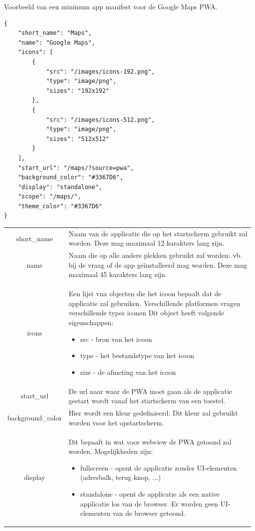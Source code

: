 	Voorbeeld van een minimum app manifest voor de Google Maps PWA.
	
\begin{lstlisting}
{
	"short_name": "Maps",
	"name": "Google Maps",
	"icons": [
		{
			"src": "/images/icons-192.png",
			"type": "image/png",
			"sizes": "192x192"
		},
		{
			"src": "/images/icons-512.png",
			"type": "image/png",
			"sizes": "512x512"
		}
	],
	"start_url": "/maps/?source=pwa",
	"background_color": "#3367D6",
	"display": "standalone",
	"scope": "/maps/",
	"theme_color": "#3367D6"
}
\end{lstlisting}
	
	
		\begin{table}[H]
			\centering
			\begin{tabular}{cp{12cm}}
	     		short\_name & Naam van de applicatie die op het startscherm gebruikt zal worden. Deze mag maximaal 12 karakters lang zijn. \\
	     		name & Naam die op alle andere plekken gebruikt zal worden: vb. bij de vraag of de app geïnstalleerd mag worden. Deze mag maximaal 45 karakters lang zijn. \\
	     		icons & Een lijst vna objecten die het icoon bepaalt dat de applicatie zal gebruiken. Verschillende platformen vragen verschillende types iconen Dit object heeft volgende eigenschappen:
		     		\begin{itemize}
			    		  \item src - bron van het icoon
			    		  \item type - het bestandstype van het icoon
			    		  \item size - de afmeting van het icoon
	     			\end{itemize} \\
	     		start\_url & De url naar waar de PWA moet gaan als de applicatie gestart wordt vanaf het startscherm van een toestel.\\
	     		background\_color & Hier wordt een kleur gedefinieerd. Dit kleur zal gebruikt worden voor het opstartscherm. \\
	     		display & Dit bepaalt in wat voor webview de PWA getoond zal worden. Mogelijkheden zijn:
		     		\begin{itemize}
			     		  \item fullscreen - opent de applicatie zonder UI-elementen (adresbalk, terug knop, ...)
			     		  \item standalone - opent de applicatie als een native applicatie los van de browser. Er worden geen UI-elementen van de browser getoond.

\end{itemize}
\end{tabular}
\end{table}
